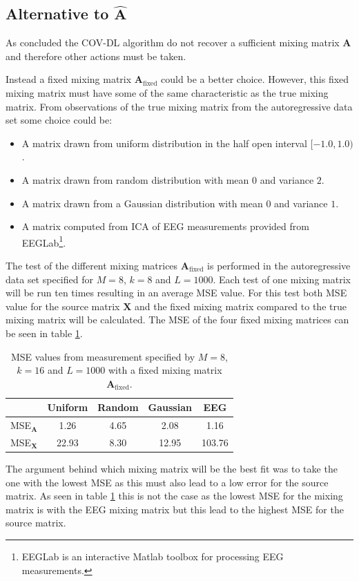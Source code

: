 \subsection{Alternative to $\hat{\textbf{A}}$}  
As concluded the COV-DL algorithm do not recover a sufficient mixing matrix $\mathbf{A}$ and therefore other actions must be taken. 

Instead a fixed mixing matrix $\mathbf{A}_{\text{fixed}}$ could be a better choice. However, this fixed mixing matrix must have some of the same characteristic as the true mixing matrix. 
From observations of the true mixing matrix from the autoregressive data set some choice could be:
\begin{itemize}
\item A matrix drawn from uniform distribution in the half open interval $[-1.0, 1.0)$.
\item A matrix drawn from random distribution with mean $0$ and variance $2$.
\item A matrix drawn from a Gaussian distribution with mean $0$ and variance $1$.
\item A matrix computed from ICA of EEG measurements provided from EEGLab\footnote{EEGLab is an interactive Matlab toolbox for processing EEG measurements.}.
\end{itemize}
The test of the different mixing matrices $\mathbf{A}_{\text{fixed}}$ is performed in the autoregressive data set specified for $M = 8$, $k = 8$ and $L = 1000$. Each test of one mixing matrix will be run ten times resulting in an average MSE value. For this test both MSE value for the source matrix $\mathbf{X}$ and the fixed mixing matrix compared to the true mixing matrix will be calculated. 
The MSE of the four fixed mixing matrices can be seen in table \ref{tab:fixed}.
\begin{table}[H]
\centering
\begin{tabular}{|c|c|c|c|c|}
\hline
 & Uniform & Random & Gaussian & EEG \\
\hline
MSE$_\mathbf{A}$ & 1.26 & 4.65 & 2.08 & 1.16 \\
\hline
MSE$_\mathbf{X}$ & 22.93 & 8.30 & 12.95 & 103.76 \\
\hline
\end{tabular}
\caption{MSE values from measurement specified by $M=8$, $k=16$ and $L=1000$ with a fixed mixing matrix $\mathbf{A}_{\text{fixed}}$.}
\label{tab:fixed}
\end{table}
\noindent
The argument behind which mixing matrix will be the best fit was to take the one with the lowest MSE as this must also lead to a low error for the source matrix. As seen in table \ref{tab:fixed} this is not the case as the lowest MSE for the mixing matrix is with the EEG mixing matrix but this lead to the highest MSE for the source matrix. 
